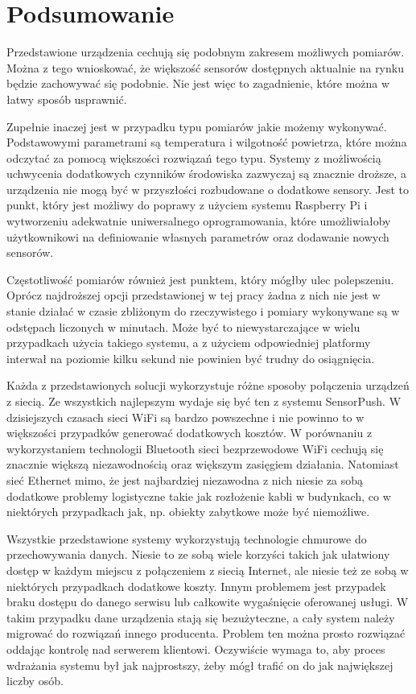 \section{Podsumowanie}
Przedstawione urządzenia cechują się podobnym zakresem możliwych pomiarów. Można z tego wnioskować, że
większość sensorów dostępnych aktualnie na rynku będzie zachowywać się podobnie. Nie jest więc to
zagadnienie, które można w łatwy sposób usprawnić.


Zupełnie inaczej jest w przypadku typu pomiarów jakie możemy wykonywać. Podstawowymi parametrami są
temperatura i wilgotność powietrza, które można odczytać za pomocą większości rozwiązań tego typu.
Systemy z możliwością uchwycenia dodatkowych czynników środowiska zazwyczaj są znacznie droższe, a
urządzenia nie mogą być w przyszłości rozbudowane o dodatkowe sensory. Jest to punkt, który jest możliwy
do poprawy z użyciem systemu Raspberry Pi i wytworzeniu adekwatnie uniwersalnego oprogramowania, które umożliwiałoby
użytkownikowi na definiowanie własnych parametrów oraz dodawanie nowych sensorów.


Częstotliwość pomiarów również jest punktem, który mógłby ulec polepszeniu. Oprócz najdroższej opcji
przedstawionej w tej pracy żadna z nich nie jest w stanie działać w czasie zbliżonym do rzeczywistego
i pomiary wykonywane są w odstępach liczonych w minutach. Może być to niewystarczające w wielu przypadkach
użycia takiego systemu, a z użyciem odpowiedniej platformy interwał na poziomie kilku sekund nie powinien być
trudny do osiągnięcia.


Każda z przedstawionych solucji wykorzystuje różne sposoby połączenia urządzeń z siecią. Ze wszystkich
najlepszym wydaje się być ten z systemu SensorPush. W dzisiejszych czasach sieci WiFi są bardzo powszechne
i nie powinno to w większości przypadków generować dodatkowych kosztów. W porównaniu z wykorzystaniem 
technologii Bluetooth sieci bezprzewodowe WiFi cechują się znacznie większą niezawodnością oraz
większym zasięgiem działania. Natomiast sieć Ethernet mimo, że jest najbardziej niezawodna z nich
niesie za sobą dodatkowe problemy logistyczne takie jak rozłożenie kabli w budynkach, co w niektórych
przypadkach jak, np. obiekty zabytkowe może być niemożliwe.


Wszystkie przedstawione systemy wykorzystują technologie chmurowe do przechowywania danych.
Niesie to ze sobą wiele korzyści takich jak ułatwiony dostęp w każdym miejscu z połączeniem z
siecią Internet, ale niesie też ze sobą w niektórych przypadkach dodatkowe koszty.
Innym problemem jest przypadek braku dostępu do danego serwisu lub całkowite wygaśnięcie oferowanej
usługi. W takim przypadku dane urządzenia stają się bezużyteczne, a cały system należy migrować
do rozwiązań innego producenta. Problem ten można prosto rozwiązać oddając kontrolę nad
serwerem klientowi. Oczywiście wymaga to, aby proces wdrażania systemu był jak najprostszy, żeby
mógł trafić on do jak największej liczby osób.


